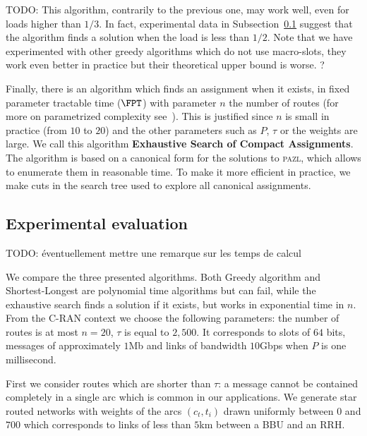 \documentclass[10pt, conference, letterpaper]{IEEEtran}
\newcommand{\todo}[1]{{\color{red} TODO: {#1}}}
\newcommand\pazl{\textsc{pazl}\xspace}
\begin{document}
\todo{This algorithm, contrarily to the previous one, may work well, even for loads higher than $1/3$.
In fact, experimental data in Subsection~\ref{sec:exp_PAZL} suggest that the algorithm finds a solution when the load is less than $1/2$. Note that we have experimented with other greedy algorithms which do not use macro-slots, they work even better in practice but their theoretical upper bound is worse. }?

Finally, there is an algorithm which finds an assignment when it exists, in fixed parameter tractable time ($\FPT$) with parameter $n$ the number of routes (for more on parametrized complexity see~\cite{downey2012parameterized}). This is justified since $n$ is small in practice (from $10$ to $20$) and the other parameters such as $P$, $\tau$ or the weights are large. We call this algorithm \textbf{Exhaustive Search of Compact Assignments}. The algorithm is based on a canonical form for the solutions to \pazl, which allows to enumerate them in reasonable time. To make it more efficient in practice, we make cuts in the search tree used to explore all canonical assignments. 

   \subsection{Experimental evaluation}\label{sec:exp_PAZL}
   
   \todo{éventuellement mettre une remarque sur les temps de calcul}
   
   We  compare the three presented algorithms. Both Greedy algorithm and Shortest-Longest are polynomial time algorithms but can fail, while the exhaustive search finds a solution if it exists, but works in exponential time in $n$. 
   From the C-RAN context we choose the following parameters: the number of routes is at most $n = 20$, $\tau$ is equal to $2,500$.
      It corresponds to slots of $64$ bits, messages of approximately $1$Mb and links of bandwidth $10$Gbps when $P$ is one millisecond.
      
      
      First we consider routes which are shorter than $\tau$: a message cannot be contained completely in a single arc which is common in our applications. We generate star routed networks with weights of the arcs $(c_t,t_i)$ drawn uniformly between $0$ and $700$ which corresponds to links of less than $5$km between a BBU and an RRH. 
\end{document}
